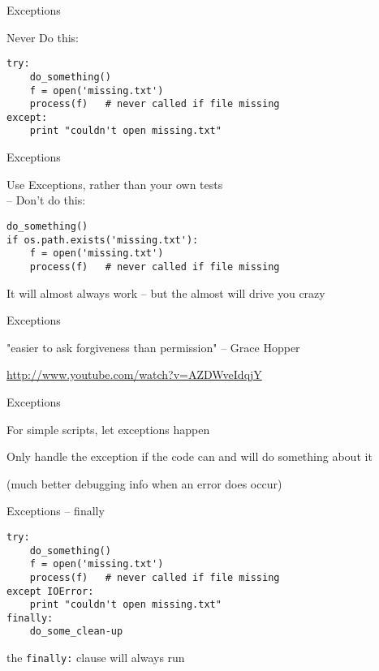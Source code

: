 \documentclass{beamer}
\begin{document}
\begin{frame}[fragile]{Exceptions}

{\Large Never Do this:}
\vfill
\begin{verbatim}
try:
    do_something()
    f = open('missing.txt')
    process(f)   # never called if file missing
except:
    print "couldn't open missing.txt"
\end{verbatim}
\vfill
\end{frame}

\begin{frame}[fragile]{Exceptions}

{\Large Use Exceptions, rather than your own tests\\
 -- Don't do this:}

\vfill
\begin{verbatim}
do_something()
if os.path.exists('missing.txt'):
    f = open('missing.txt')
    process(f)   # never called if file missing
\end{verbatim}

\vfill
It will almost always work -- but the almost will drive you crazy
\end{frame}

\begin{frame}[fragile]{Exceptions}

{\centering

{\Large "easier to ask forgiveness than permission"
\vfill
\hfill -- Grace Hopper
}}

\vfill
\url{http://www.youtube.com/watch?v=AZDWveIdqjY}

\end{frame}

\begin{frame}[fragile]{Exceptions}

\vfill
{\Large 
For simple scripts, let exceptions happen\\
\vfill

Only handle the exception if the code can and will do something about it
}
\vfill
(much better debugging info when an error does occur)
\end{frame}


\begin{frame}[fragile]{Exceptions -- finally }

\vfill
\begin{verbatim}
try:
    do_something()
    f = open('missing.txt')
    process(f)   # never called if file missing
except IOError:
    print "couldn't open missing.txt"
finally:
    do_some_clean-up
\end{verbatim}
\vfill
{\Large the \verb|finally:| clause will always run}
\end{frame}
\end{document}
